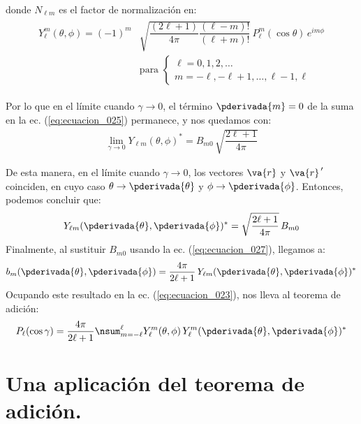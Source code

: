donde $N_{\ell m}$ es el factor de normalización en:
\begin{align}
\begin{aligned}
Y_{\ell}^{m} (\theta, \phi) = (-1)^{m} &\sqrt{\dfrac{(2 \ell +1)}{4 \pi} \dfrac{(\ell - m)!}{(\ell + m)!}} \, P_{\ell}^{m} (\cos \theta)  \, e^{i m \phi} \\[0.5em]
&\mbox{para } \begin{cases}
\ell = 0, 1, 2, \ldots \\
m = - \ell, -\ell +1, \ldots , \ell -1,  \ell
\end{cases}
\end{aligned}
\label{eq:ecuacion_09}
\end{align}

Por lo que en el límite cuando $\gamma \to 0$, el término $\pderivada{m} = 0$ de la suma en la ec. (\ref{eq:ecuacion_025}) permanece, y nos quedamos con:
\begin{align*}
\lim_{\gamma \to 0} Y_{\ell m} (\theta, \phi)^{*} = B_{m 0} \, \sqrt{\dfrac{2 \ell + 1}{4 \pi}}
\end{align*}

De esta manera, en el límite cuando $\gamma \to 0$, los vectores $\va{r}$ y $\va{r}^{\,\prime}$ coinciden, en cuyo caso $\theta \to \pderivada{\theta}$ y $\phi \to \pderivada{\phi}$. Entonces, podemos concluir que:
\begin{align*}
Y_{\ell m} (\pderivada{\theta}, \pderivada{\phi})^{*} = \sqrt{\dfrac{2 \ell + 1}{4 \pi}} \, B_{m 0}
\end{align*}
Finalmente, al sustituir $B_{m0}$ usando la ec. (\ref{eq:ecuacion_027}), llegamos a:
\begin{align*}
b_{m} (\pderivada{\theta}, \pderivada{\phi}) = \dfrac{4 \pi}{2 \ell + 1} \, Y_{\ell m} (\pderivada{\theta}, \pderivada{\phi})^{*}
\end{align*}
Ocupando este resultado en la ec. (\ref{eq:ecuacion_023}), nos lleva al teorema de adición:
\begin{align}
P_{\ell} (\cos \gamma) = \dfrac{4 \pi}{2 \ell + 1} \nsum_{m=-\ell}^{\ell} Y_{\ell}^{m} (\theta, \phi) \, Y_{\ell}^{m} (\pderivada{\theta}, \pderivada{\phi})^{*}
\label{eq:ecuacion_028}
\end{align}

\section{Una aplicación del teorema de adición.}

